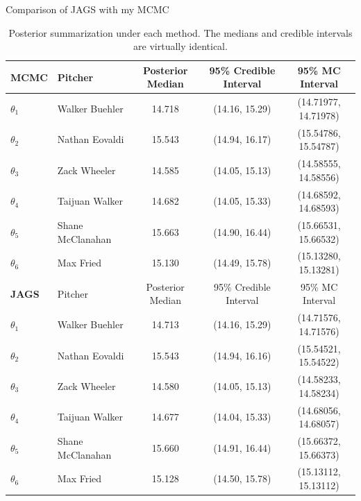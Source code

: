 \documentclass[xcolor=dvipsnames]{beamer}
\begin{document}
\begin{frame}{Comparison of JAGS with my MCMC}

\begin{table}[h]
    \centering
    {\tiny %
    \begin{tabular}{llccc}
         \hline
         \textbf{MCMC} & Pitcher & Posterior Median & 95\% Credible Interval & 95\% MC Interval \\
         \hline
         $\theta_1$ & Walker Buehler & 14.718 & (14.16, 15.29) & (14.71977, 14.71978) \\
         $\theta_2$ & Nathan Eovaldi & 15.543 & (14.94, 16.17) & (15.54786, 15.54787) \\
         $\theta_3$ & Zack Wheeler & 14.585 & (14.05, 15.13) & (14.58555, 14.58556) \\
         $\theta_4$ & Taijuan Walker & 14.682 & (14.05, 15.33) & (14.68592, 14.68593) \\
         $\theta_5$ & Shane McClanahan & 15.663 & (14.90, 16.44) & (15.66531, 15.66532) \\
         $\theta_6$ & Max Fried & 15.130 & (14.49, 15.78) & (15.13280, 15.13281) \\
         \hline
         \textbf{JAGS} & Pitcher & Posterior Median & 95\% Credible Interval & 95\% MC Interval \\
         \hline
         $\theta_1$ & Walker Buehler & 14.713 & (14.16, 15.29) & (14.71576, 14.71576) \\
         $\theta_2$ & Nathan Eovaldi &  15.543 & (14.94, 16.16) & (15.54521, 15.54522) \\
         $\theta_3$ & Zack Wheeler & 14.580 & (14.05, 15.13) & (14.58233, 14.58234) \\
         $\theta_4$ & Taijuan Walker & 14.677 & (14.04, 15.33) & (14.68056, 14.68057) \\
         $\theta_5$ & Shane McClanahan & 15.660 & (14.91, 16.44) & (15.66372, 15.66373) \\
         $\theta_6$ & Max Fried & 15.128 & (14.50, 15.78) & (15.13112, 15.13112) \\
         \hline
    \end{tabular}
    }%
    \caption{Posterior summarization under each method. The medians and credible intervals are virtually identical.}
    \label{tab:bayes-ests}
\end{table}

\end{frame}

\end{document}
